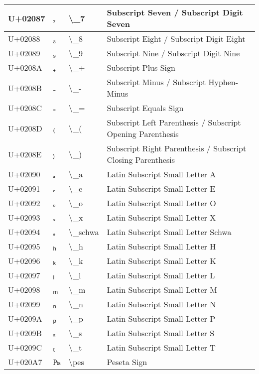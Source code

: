 \begin{table}[h]
\begin{tabulary}{\linewidth}{|L|L|L|L|}
U+02087 & ₇ & {\textbackslash}\_7 & Subscript Seven / Subscript Digit Seven \\
\hline
U+02088 & ₈ & {\textbackslash}\_8 & Subscript Eight / Subscript Digit Eight \\
\hline
U+02089 & ₉ & {\textbackslash}\_9 & Subscript Nine / Subscript Digit Nine \\
\hline
U+0208A & ₊ & {\textbackslash}\_+ & Subscript Plus Sign \\
\hline
U+0208B & ₋ & {\textbackslash}\_- & Subscript Minus / Subscript Hyphen-Minus \\
\hline
U+0208C & ₌ & {\textbackslash}\_= & Subscript Equals Sign \\
\hline
U+0208D & ₍ & {\textbackslash}\_( & Subscript Left Parenthesis / Subscript Opening Parenthesis \\
\hline
U+0208E & ₎ & {\textbackslash}\_) & Subscript Right Parenthesis / Subscript Closing Parenthesis \\
\hline
U+02090 & ₐ & {\textbackslash}\_a & Latin Subscript Small Letter A \\
\hline
U+02091 & ₑ & {\textbackslash}\_e & Latin Subscript Small Letter E \\
\hline
U+02092 & ₒ & {\textbackslash}\_o & Latin Subscript Small Letter O \\
\hline
U+02093 & ₓ & {\textbackslash}\_x & Latin Subscript Small Letter X \\
\hline
U+02094 & ₔ & {\textbackslash}\_schwa & Latin Subscript Small Letter Schwa \\
\hline
U+02095 & ₕ & {\textbackslash}\_h & Latin Subscript Small Letter H \\
\hline
U+02096 & ₖ & {\textbackslash}\_k & Latin Subscript Small Letter K \\
\hline
U+02097 & ₗ & {\textbackslash}\_l & Latin Subscript Small Letter L \\
\hline
U+02098 & ₘ & {\textbackslash}\_m & Latin Subscript Small Letter M \\
\hline
U+02099 & ₙ & {\textbackslash}\_n & Latin Subscript Small Letter N \\
\hline
U+0209A & ₚ & {\textbackslash}\_p & Latin Subscript Small Letter P \\
\hline
U+0209B & ₛ & {\textbackslash}\_s & Latin Subscript Small Letter S \\
\hline
U+0209C & ₜ & {\textbackslash}\_t & Latin Subscript Small Letter T \\
\hline
U+020A7 & ₧ & {\textbackslash}pes & Peseta Sign \\

\end{tabulary}
\end{table}
